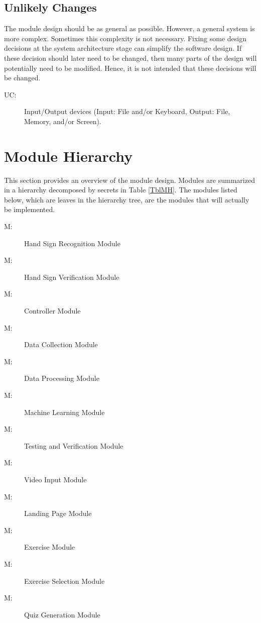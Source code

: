 \documentclass[12pt, titlepage]{article}
\newcounter{ucnum}
\newcommand{\uctheucnum}{UC\theucnum}
\newcounter{mnum}
\newcommand{\mthemnum}{M\themnum}
\begin{document}
\subsection{Unlikely Changes} \label{SecUchange}

The module design should be as general as possible. However, a general system is
more complex. Sometimes this complexity is not necessary. Fixing some design
decisions at the system architecture stage can simplify the software design. If
these decision should later need to be changed, then many parts of the design
will potentially need to be modified. Hence, it is not intended that these
decisions will be changed.

\begin{description}
\item[ \uctheucnum \label{ucIO}:] Input/Output devices
  (Input: File and/or Keyboard, Output: File, Memory, and/or Screen).
\end{description}

\section{Module Hierarchy} \label{SecMH}

This section provides an overview of the module design. Modules are summarized
in a hierarchy decomposed by secrets in Table \ref{TblMH}. The modules listed
below, which are leaves in the hierarchy tree, are the modules that will
actually be implemented.

\begin{description}
\item [ \mthemnum \label{m1}:] Hand Sign Recognition Module
\item [ \mthemnum \label{m2}:] Hand Sign Verification Module
\item [ \mthemnum \label{m3}:] Controller Module
\item [ \mthemnum \label{m4}:] Data Collection Module
\item [ \mthemnum \label{m5}:] Data Processing Module
\item [ \mthemnum \label{m6}:] Machine Learning Module
\item [ \mthemnum \label{m7}:] Testing and Verification Module
\item [ \mthemnum \label{m8}:] Video Input Module
\item [ \mthemnum \label{m9}:] Landing Page Module
\item [ \mthemnum \label{m10}:] Exercise Module
\item [ \mthemnum \label{m11}:] Exercise Selection Module
\item [ \mthemnum \label{m12}:] Quiz Generation Module
\end{description}
\end{document}
